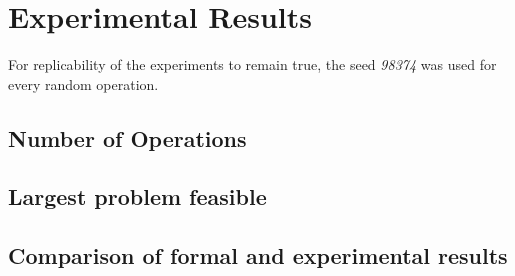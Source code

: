 \documentclass[mirror,times]{revdetua}
\begin{document}
\section{Experimental Results}
For replicability of the experiments to remain true, the seed \textit{98374} was used for
every random operation.
\subsection{Number of Operations}

\subsection{Largest problem feasible}

\subsection{Comparison of formal and experimental results} 


\end{document}
